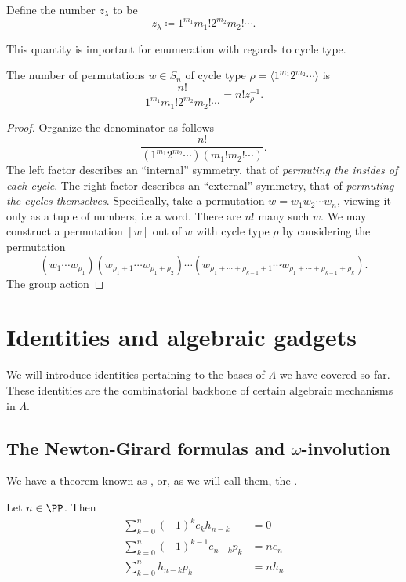 \documentclass{article}
\begin{document}
\begin{definition}
    Define the number $z_\lambda$ to be
    \[
        z_\lambda \coloneq 1^{m_1}m_1!2^{m_2}m_2!\cdots.
    \]
\end{definition}

This quantity is important for enumeration with regards to cycle type.

\begin{theorem}
    The number of permutations $w \in S_n$ of cycle type $\rho = \langle 1^{m_1}2^{m_2}\cdots\rangle$ is
    \[
        \frac{n!}{1^{m_1}m_1!2^{m_2}m_2!\cdots} = n!z_\rho^{-1}.
    \]
\end{theorem}

\begin{proof}
    Organize the denominator as follows
    \[
        \frac{n!}{(1^{m_1}2^{m_2}\cdots)(m_1!m_2!\cdots)}.
    \]
    The left factor describes an ``internal'' symmetry, that of \textit{permuting the insides of each cycle}. 
    The right factor describes an ``external'' symmetry, that of \textit{permuting the cycles themselves}.
    Specifically, take a permutation $w = w_1w_2\cdots w_n$, viewing it only as a tuple of numbers, i.e a word.
    There are $n!$ many such $w$.
    We may construct a permutation $[w]$ out of $w$ with cycle type $\rho$ by considering the permutation
    \[
        (w_1\cdots w_{\rho_1})
        (w_{\rho_1+1}\cdots w_{\rho_1+\rho_2})\cdots(w_{\rho_1+\cdots+\rho_{k-1}+1}\cdots w_{\rho_1+\cdots+\rho_{k-1}+\rho_k}).
    \]
    The group action 
\end{proof}

\section{Identities and algebraic gadgets}

We will introduce identities pertaining to the bases of $\Lambda$ we have covered so far.
These identities are the combinatorial backbone of certain algebraic mechanisms in $\Lambda$.

\subsection{
    The Newton-Girard formulas
    and \texorpdfstring{$\omega$}{ω}-involution
}

We have a theorem known as , or, as we will call them, the .

\begin{theorem}
    Let $n \in \PP$. Then
    \begin{align}
        \sum_{k=0}^n (-1)^k e_kh_{n-k} &= 0 \label{ng1} \\
        \sum_{k=0}^n (-1)^{k-1} e_{n-k}p_k &= ne_n  \label{ng2} \\
        \sum_{k=0}^n h_{n-k}p_k &= nh_n \label{eq:ng3}
    \end{align}
\end{theorem}
\end{document}

